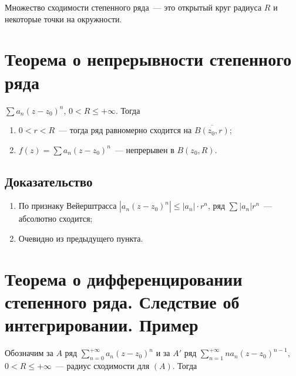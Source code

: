 \documentclass{article}
\begin{document}
            Множество сходимости степенного ряда~--- это открытый круг радиуса $R$ и некоторые точки на окружности.
            
    \newpage
    
    \section{Теорема о непрерывности степенного ряда}
    
        $\sum a_n(z - z_0)^n$, $0 < R \leq +\infty$. Тогда 
        
        \begin{enumerate}
        
            \item $0 < r < R$~--- тогда ряд равномерно сходится на $\overline{B(z_0, r)}$;
            
            \item $f(z) = \sum a_n (z - z_0)^n$~--- непрерывен в $B(z_0, R)$.
        
        \end{enumerate}
        
        \subsection{Доказательство}
        
            \begin{enumerate}
            
                \item По признаку Вейерштрасса $\left| a_n (z - z_0)^n \right| \leq | a_n | \cdot r^n$, ряд $\sum | a_n | r^n$~--- абсолютно сходится;
                
                \item Очевидно из предыдущего пункта.
                
            \end{enumerate}
            
    \newpage
    
    \section{Теорема о дифференцировании степенного ряда. Следствие об интегрировании. Пример}
    
        Обозначим за $A$ ряд $\sum\limits^{+\infty}_{n = 0} a_n (z - z_0)^n$ и за $A'$ ряд $\sum\limits^{+\infty}_{n = 1} n a_n (z - z_0)^{n - 1}$, $0 < R \leq +\infty$~--- радиус сходимости для $(A)$. Тогда
        
\end{document}
